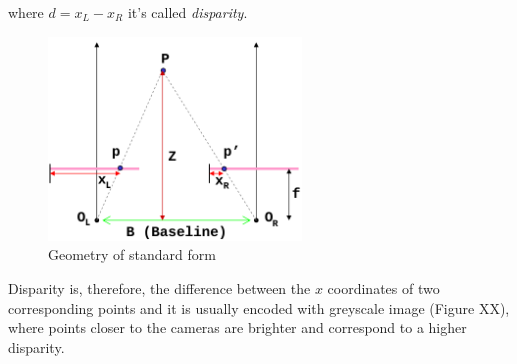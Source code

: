 where $ d = x_{L} - x_{R} $ it's called \textit{disparity}.\\
\begin{figure}[h!]
\centering
\includegraphics[width=0.6\textwidth]{./img/depth.png}
\caption{\small{Geometry of standard form}}
\label{fig:depth}
\end{figure}
Disparity is, therefore, the difference between the $x$ coordinates of two corresponding points and it is usually encoded with greyscale image (Figure XX), where points closer to the cameras are brighter and correspond to a higher disparity.\\
